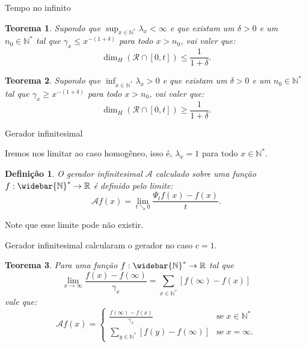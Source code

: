 \documentclass[xcolor=pdftex,dvipsnames]{beamer}
\newcommand{\AAA}{{\mathcal{A}}}
\newcommand{\RR}{{\mathcal{R}}}
\newcommand{\Nz}{{\mathbb{N^*}}}
\newcommand{\Nzb}{{\mathbb{\widebar{N}^*}}}
\newcommand{\R}{{\mathbb{R}}}
\newtheorem{teorema}{Teorema}
\newtheorem{definicao}{Definição}
\begin{document}
\begin{frame}{Tempo no infinito}

  \begin{teorema}
    Supondo que $\sup_{x\in\Nz}\lambda_x < \infty$ e que existam um
    $\delta>0$ e um $n_0 \in \Nz$ tal que $\gamma_x \leq
    x^{-(1+\delta)}$ para todo $x > n_0$, vai valer que:
    \begin{displaymath}
      \dim_H(\RR \cap [0, t]) \leq \frac{1}{1+\delta} .
    \end{displaymath}
  \end{teorema}

  \begin{teorema}
    Supondo que $\inf_{x\in\Nz}\lambda_x > 0$ e que existam um
    $\delta>0$ e um $n_0 \in \Nz$ tal que $\gamma_x \geq
    x^{-(1+\delta)}$ para todo $x > n_0$, vai valer que:
    \begin{displaymath}
      \dim_H(\RR \cap [0, t]) \geq \frac{1}{1+\delta} .
    \end{displaymath}
  \end{teorema}
\end{frame}



\begin{frame}{Gerador infinitesimal}

  Iremos nos limitar ao caso homogêneo, isso é, $\lambda_x = 1$ para
  todo $x \in \Nz$.

  \begin{definicao}
    O gerador infinitesimal $\AAA$ calculado sobre uma função $f: \Nzb
    \to \R$ é definido pelo limite:
    \begin{displaymath}
      \AAA f (x) = \lim_{t \searrow 0} \frac{\Psi_t f (x) - f(x)}{t}.
    \end{displaymath}
  \end{definicao}
  
  Note que esse limite pode não existir.

\end{frame}  


\begin{frame}{Gerador infinitesimal}
  \cite{kendall:56} calcularam o gerador no caso $c = 1$.

  \begin{teorema}
  Para uma função $f: \Nzb \to \R$ tal que
  \begin{displaymath}
    \lim_{x \to \infty}
    \frac{f(x) - f(\infty)}{\gamma_x} = \sum_{x \in \Nz}
    [f(\infty) - f(x)]
  \end{displaymath}
  vale que:
  \begin{displaymath}
    \AAA f (x) = \begin{cases}
      \displaystyle
      \frac{f(\infty) - f(x)}{\gamma_x} & \text{se } x \in \Nz\\
      \displaystyle
      \sum_{y\in \Nz} [f(y) - f(\infty)] & \text{se } x = \infty.
    \end{cases}
  \end{displaymath}
\end{teorema}
\end{frame}
\end{document}
